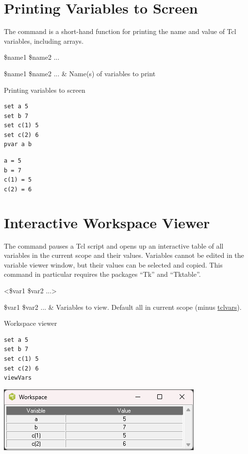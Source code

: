 \documentclass{article}
\renewcommand{\^}[1]{\textsuperscript{#1}}
\renewcommand{\_}[1]{\textsubscript{#1}}
\begin{document}
\clearpage
\section{Printing Variables to Screen} 
The  command is a short-hand function for printing the name and value of Tcl variables, including arrays.
\begin{syntax}
 \$name1 \$name2 ...
\end{syntax}
\begin{args}
\$name1 \$name2 ... & Name(s) of variables to print
\end{args}

\begin{example}{Printing variables to screen}
\begin{lstlisting}
set a 5
set b 7
set c(1) 5
set c(2) 6
pvar a b
\end{lstlisting}
\tcblower
\begin{lstlisting}
a = 5
b = 7
c(1) = 5
c(2) = 6
\end{lstlisting}
\end{example}

\clearpage
\section{Interactive Workspace Viewer} 
The command  pauses a Tcl script and opens up an interactive table of all variables in the current scope and their values. Variables cannot be edited in the variable viewer window, but their values can be selected and copied. This command in particular requires the packages ``Tk'' and ``Tktable''.
\begin{syntax}
 <\$var1 \$var2 ...>
\end{syntax}
\begin{args}
\$var1 \$var2 ... & Variables to view. Default all in current scope (minus \href{https://www.tcl-lang.org/man/tcl/TclCmd/tclvars.htm}{tclvars}).
\end{args}
\begin{example}{Workspace viewer}
\begin{lstlisting}
set a 5
set b 7
set c(1) 5
set c(2) 6
viewVars
\end{lstlisting}
\tcblower

\includegraphics{figures/workspace.png}
\end{example}
\end{document}
